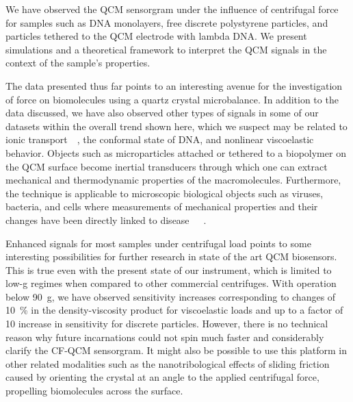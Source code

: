 We have observed the QCM sensorgram under the influence of centrifugal force
for samples such as DNA monolayers, free discrete polystyrene particles, and
particles tethered to the QCM electrode with lambda DNA\@.  We present
simulations and a theoretical framework to interpret the QCM signals in the
context of the sample's properties.

The data presented thus far points to an interesting avenue for the
investigation of force on biomolecules using a quartz crystal microbalance.  In
addition to the data discussed, we have also observed other types of signals in
some of our datasets within the overall trend shown here, which we suspect may
be related to ionic
transport~\cite{tolman1911electromotive}~\cite{des1893unpolarisirbare}, the
conformal state of DNA, and nonlinear viscoelastic behavior.  Objects such as
microparticles attached or tethered to a biopolymer on the QCM surface become
inertial transducers through which one can extract mechanical and thermodynamic
properties of the macromolecules. Furthermore, the technique is applicable to
microscopic biological objects such as viruses, bacteria, and cells where
measurements of mechanical properties and their changes have been directly
linked to
disease~\cite{merkel1989molecular}~\cite{yeri2009mutation}~\cite{tevet2011friction}.

Enhanced signals for most samples under centrifugal load points to some
interesting possibilities for further research in state of the art QCM
biosensors.  This is true even with the present state of our instrument, which
is limited to low-g regimes when compared to other commercial centrifuges. With
operation below \SI{90}{g}, we have observed sensitivity increases
corresponding to changes of \SI{10}{\percent} in the density-viscosity product
for viscoelastic loads and up to a factor of 10 increase in sensitivity for
discrete particles.  However, there is no technical reason why future
incarnations could not spin much faster and considerably clarify the CF-QCM
sensorgram.  It might also be possible to use this platform in other related
modalities such as the nanotribological effects of sliding
friction~\cite{krim1991nanotribology} caused by orienting the crystal at an
angle to the applied centrifugal force, propelling biomolecules across the
surface.

